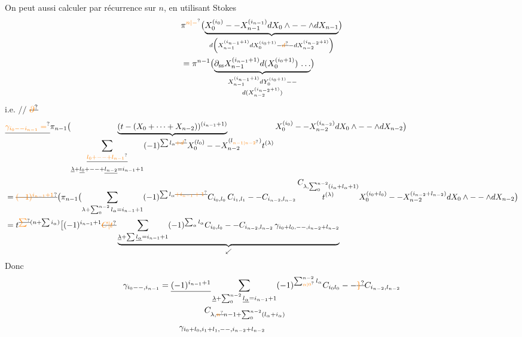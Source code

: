 On peut aussi calculer par récurrence sur $n$, en utilisant Stokes
\[
 \begin{aligned}
 &\pi^{\unsure{n|-}}\bigl(\underbrace{X_0^{(i_0)}--X_{n-1}^{(i_{n-1})}dX_0\wedge--\wedge dX_{n-1}}_{
 d\left(X_{n-1}^{(i_{n-1}+1)}dX_0^{(i_0+1)}-\deleted{\unsure{d}}-dX_{n-2}^{(i_{n-2}+1)}\right)}\bigr)\\
 &=\pi^{n-1}\bigl(\underbrace{\partial_{\mathrm{ss}}X_{n-1}^{(i_{n-1}+1)}d(X_0^{(i_0+1)})\,\ldots}_{
 \substack{X_{n-1}^{(i_{n-1}+1)}dY_0^{(i_0+1)}--\\d(X_{n-2}^{(i_{n-2}+1)})}}\bigr)
 \end{aligned}
\]
i.e. $\mathrel{/\!/}$ $\deleted{\unsure{\partial}}$
\[
 \begin{aligned}
 &\deleted{\unsure{\gamma_{i_0--i_{n-1}}=}}\pi_{n-1}\bigl(
 \underbrace{(t-(X_0+\cdots+X_{n-2}))^{(i_{n-1}+1)}}_{
 \substack{\displaystyle\sum_{\substack{\deleted{\unsure{l_0+--+l_{n-1}}}\\\underline\lambda+\underline{l_0}+--+\underline{l_{n-2}}=i_{n-1}+1}}
 (-1)^{\sum l_\alpha\deleted{\unsure{+d}}} X_0^{(l_0)}--X_{n-2}^{(l_{\unsure{n-1|n-2}})}t^{(\lambda)}}}
 X_0^{(i_0)}--X_{n-2}^{(i_{n-2})}dX_0\wedge--\wedge dX_{n-2}\bigr)\\
 &=\deleted{\unsure{(-1)^{i_{n-1}+1}}}\bigl(\pi_{n-1}\bigl(
 \sum_{\lambda+\sum_0^{n-2}l_\alpha=i_{n-1}+1}
 (-1)^{\sum l_\alpha\deleted{\unsure{+i_{n-1}+1}}}
 C_{i_0,l_0}\,C_{i_1,l_1}--C_{i_{n-2},l_{n-2}}\,
 \overset{\displaystyle C_{\lambda,\sum_0^{n-2}(i_\alpha+l_\alpha+1)}}{t^{(\lambda)}}
 X_0^{(i_0+l_0)}--X_{n-2}^{(i_{n-2}+l_{n-2})}dX_0\wedge--\wedge dX_{n-2}\bigr)\\
 &=t^{\deleted{\unsure{\sum}}(n+\sum i_\alpha)}
 \bigl[(-1)^{i_{n-1}+1}\deleted{\unsure{C|t}}
 \underbrace{\sum_{\underline\lambda+\sum\underline{l_\alpha}=i_{n-1}+1}(-1)^{\sum_\alpha l_\alpha}
 C_{i_0,l_0}--C_{i_{n-2},l_{n-2}}\,
 \gamma_{i_0+l_0,--,i_{n-2}+l_{n-2}}}_{\swarrow}
 \end{aligned}
\]
Donc
\[
 \begin{aligned}
 \gamma_{i_0--,i_{n-1}}={}&\deleted{(-1)^{i_{n-1}+1}}
 \sum_{\underline\lambda+\sum_0^{n-2}\underline{l_\alpha}=i_{n-1}+1}
 (-1)^{\sum_{\unsure{\alpha|0}}^{n-2}l_\alpha}
 C_{i_0l_0}--\deleted{\unsure{\}}}C_{i_{n-2},l_{n-2}}\\[-2pt]
 &\hspace{4em} C_{\lambda,\deleted{\unsure{n}}n-1+\sum_0^{n-2}(l_\alpha+i_\alpha)}\\
 &\hspace{1em}\gamma_{i_0+l_0,i_1+l_1,--,i_{n-2}+l_{n-2}}
 \end{aligned}
\]
